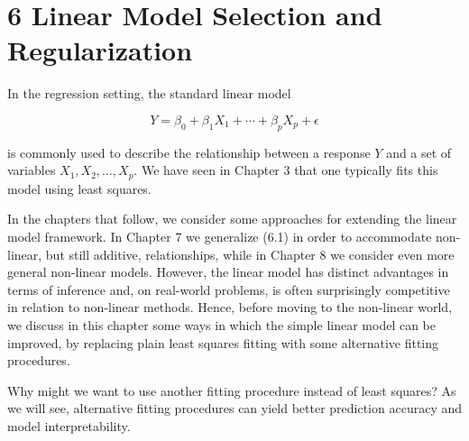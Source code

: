 \documentclass[10pt]{article}
\begin{document}
\section*{6 Linear Model Selection and Regularization}
In the regression setting, the standard linear model


\begin{equation*}
Y=\beta_{0}+\beta_{1} X_{1}+\cdots+\beta_{p} X_{p}+\epsilon \tag{6.1}
\end{equation*}


is commonly used to describe the relationship between a response $Y$ and a set of variables $X_{1}, X_{2}, \ldots, X_{p}$. We have seen in Chapter 3 that one typically fits this model using least squares.

In the chapters that follow, we consider some approaches for extending the linear model framework. In Chapter 7 we generalize (6.1) in order to accommodate non-linear, but still additive, relationships, while in Chapter 8 we consider even more general non-linear models. However, the linear model has distinct advantages in terms of inference and, on real-world problems, is often surprisingly competitive in relation to non-linear methods. Hence, before moving to the non-linear world, we discuss in this chapter some ways in which the simple linear model can be improved, by replacing plain least squares fitting with some alternative fitting procedures.

Why might we want to use another fitting procedure instead of least squares? As we will see, alternative fitting procedures can yield better prediction accuracy and model interpretability.
\end{document}
